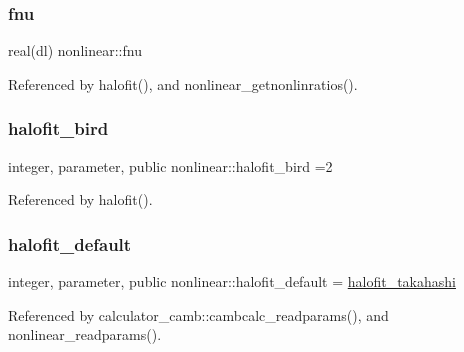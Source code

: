 \mbox{\label{namespacenonlinear_a41cbc8f2a7d3a4a7133a330e7a96f32f}} 
\subsubsection{\texorpdfstring{fnu}{fnu}}
{\footnotesize\ttfamily real(dl) nonlinear\+::fnu\hspace{0.3cm}{\ttfamily [private]}}



Referenced by halofit(), and nonlinear\+\_\+getnonlinratios().

\mbox{\label{namespacenonlinear_a60a8667a6b76aac6cb917e86e5e813bf}} 
\subsubsection{\texorpdfstring{halofit\+\_\+bird}{halofit\_bird}}
{\footnotesize\ttfamily integer, parameter, public nonlinear\+::halofit\+\_\+bird =2}



Referenced by halofit().

\mbox{\label{namespacenonlinear_a17d0a06b4737dd11deb01679dd462d0d}} 
\subsubsection{\texorpdfstring{halofit\+\_\+default}{halofit\_default}}
{\footnotesize\ttfamily integer, parameter, public nonlinear\+::halofit\+\_\+default = \mbox{\hyperlink{namespacenonlinear_aac3355efc27ec1212dfc7d494c94b8bd}{halofit\+\_\+takahashi}}}



Referenced by calculator\+\_\+camb\+::cambcalc\+\_\+readparams(), and nonlinear\+\_\+readparams().

\mbox{\label{namespacenonlinear_ac93879b4e408404c04347ff8ba8e170c}} 
